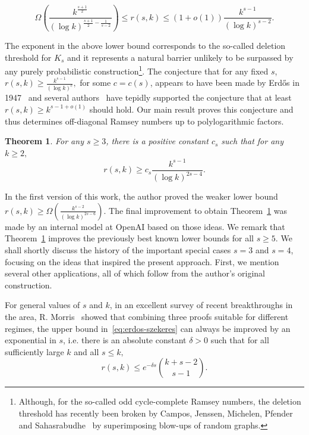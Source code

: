 \documentclass{article}
\theoremstyle{plain}
\newtheorem{theorem}{Theorem}[section]
\theoremstyle{definition}
\begin{document}
\begin{equation} \label{eq:old-bounds}
    \Omega\left(\frac{k^{\frac{s+1}{2}}}{(\log k)^{\frac{s+1}{2} - \frac{1}{s-2}}} \right) \le r(s, k) \le (1 + o(1))\frac{k^{s-1}}{(\log k)^{s-2}}.
\end{equation} 

The exponent in the above lower bound corresponds to the so-called deletion threshold for $K_s$ and it represents a natural barrier unlikely to be surpassed by any purely probabilistic construction\footnote{Although, for the so-called odd cycle-complete Ramsey numbers, the deletion threshold has recently been broken by Campos, Jenssen, Michelen, Pfender and Sahasrabudhe~\cite{oddcyclecomplete} by superimposing blow-ups of random graphs.}. The conjecture that for any fixed $s$, $r(s, k) \ge \frac{k^{s-1}}{(\log k)^c},$ for some $c = c(s)$, appears to have been made by Erd\H{o}s in 1947~\cite{chung-graham} and several authors~\cite{spencer77, mubayi-verstraete, CMMV-zarankiewicz} have tepidly supported the conjecture that at least $r(s, k) \ge k^{s-1+o(1)}$ should hold. Our main result proves this conjecture and thus determines off-diagonal Ramsey numbers up to polylogarithmic factors.

\begin{theorem} \label{thm:main}
    For any $s \ge 3$, there is a positive constant $c_s$ such that for any $k \ge 2,$
    \[ r(s, k) \ge c_s \frac{k^{s-1}}{(\log k)^{2s-4}}. \]
\end{theorem}
In the first version of this work, the author proved the weaker lower bound $r(s, k) \ge \Omega\left( \frac{k^{s-2}}{(\log k)^{2s-6}} \right)$. The final improvement to obtain Theorem~\ref{thm:main} was made by an internal model at OpenAI based on those ideas. We remark that Theorem~\ref{thm:main} improves the previously best known lower bounds for all $s \ge 5$. We shall shortly discuss the history of the  important special cases $s = 3$ and $s = 4$, focusing on the ideas that inspired the present approach. First, we mention several other applications, all of which follow from the author's original construction.

For general values of $s$ and $k$, in an excellent survey of recent breakthroughs in the area, R. Morris~\cite{morris-survey} showed that combining three proofs suitable for different regimes, the upper bound in~\eqref{eq:erdos-szekeres} can always be improved by an exponential in $s$, i.e. there is an absolute constant $\delta > 0$ such that for all sufficiently large $k$ and all $s \le k,$
\begin{equation} \label{eq:morris}
    r(s, k) \le e^{-\delta s} \binom{k+s-2}{s-1}.
\end{equation}
\end{document}
